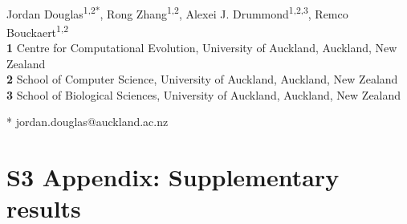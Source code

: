 \documentclass[12pt]{article}
\begin{document}
\vspace*{0.2in}

\begin{flushleft}
{\Large
\textbf{} %
}
\newline
\\
Jordan Douglas\textsuperscript{1,2*},
Rong Zhang\textsuperscript{1,2},
Alexei J. Drummond\textsuperscript{1,2,3},
Remco Bouckaert\textsuperscript{1,2}
\\
\bigskip
\textbf{1} Centre for Computational Evolution,  University of Auckland, Auckland, New Zealand\\
\textbf{2} School of Computer Science, University of Auckland, Auckland, New Zealand\\
\textbf{3} School of Biological Sciences, University of Auckland, Auckland, New Zealand
\\
\bigskip


* jordan.douglas@auckland.ac.nz


\end{flushleft}


\section*{S3 Appendix: Supplementary results}
\end{document}
